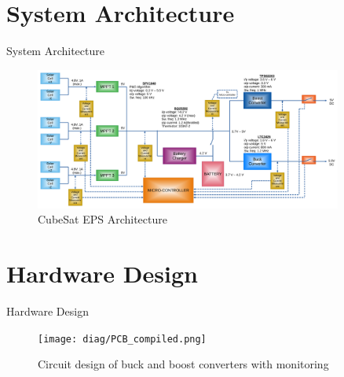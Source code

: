 \documentclass[aspectratio=169]{beamer}
\begin{document}
		
		
		\section{System Architecture}
		\begin{frame}{System Architecture}
			\begin{figure}[h]
				\centering
				\includegraphics[width=0.9\textwidth]{diag1 with specs.pdf}
				\caption{CubeSat EPS Architecture}
				\label{fig:mesh1}
			\end{figure}
			
			
		\end{frame}
		
		\section{Hardware Design}
				\begin{frame}{Hardware Design}
					\begin{figure}[h]
								\centering
								\texttt{[image: diag/PCB\_compiled.png]}
								\caption{Circuit design of buck and boost converters with monitoring}
								\label{fig:bubo}
							\end{figure}
					\end{frame}
		
		
		
\end{document}
